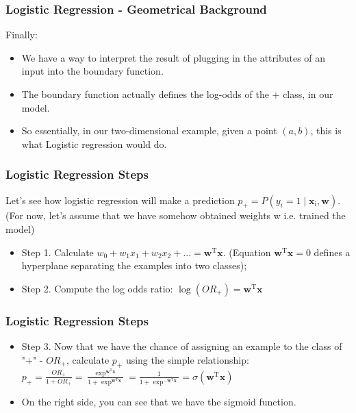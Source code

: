 \begin{frame}[fragile]\frametitle{Logistic Regression - Geometrical Background}
Finally:
\begin{itemize}
\item 
We have a way to interpret the result of plugging in the attributes of an input into the boundary function. 
\item The boundary function actually defines the log-odds of the + class, in our model. 
\item So essentially, in our two-dimensional example, given a point $(a, b)$, this is what Logistic regression would do.

\end{itemize}

\end{frame}

\begin{frame}[fragile]\frametitle{Logistic Regression Steps}
Let's see how logistic regression will make a prediction $p_+ = P\left(y_i = 1 \mid \textbf{x}_\text{i}, \textbf{w}\right)$. (For now, let's assume that we have somehow obtained weights w i.e. trained the model)
 \begin{itemize}
 
\item Step 1. Calculate $w_{0}+w_{1}x_1 + w_{2}x_2 + ... = \textbf{w}^\text{T}\textbf{x}$. (Equation $\textbf{w}^\text{T}\textbf{x} = 0$ defines a hyperplane separating the examples into two classes);

\item Step 2. Compute the log odds ratio: $\log(OR_{+}) = \textbf{w}^\text{T}\textbf{x}$
\end{itemize}

\end{frame}

\begin{frame}[fragile]\frametitle{Logistic Regression Steps}
 \begin{itemize}

\item Step 3. Now that we have the chance of assigning an example to the class of "+" - $OR_{+}$, calculate $p_{+}$ using the simple relationship:
$ p_{+} = \frac{OR_{+}}{1 + OR_{+}} = \frac{\exp^{\textbf{w}^\text{T}\textbf{x}}}{1 + \exp^{\textbf{w}^\text{T}\textbf{x}}} = \frac{1}{1 + \exp^{-\textbf{w}^\text{T}\textbf{x}}} = \sigma(\textbf{w}^\text{T}\textbf{x})$
\item On the right side, you can see that we have the sigmoid function.
\end{itemize}

\end{frame}



